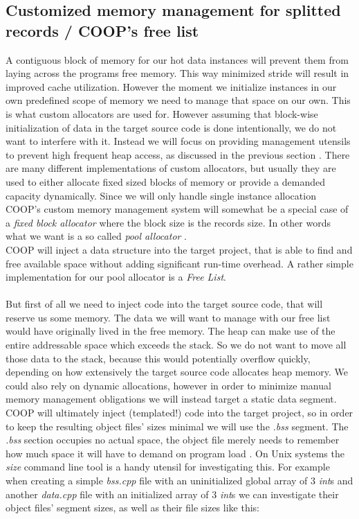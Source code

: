 \subsection{Customized memory management for splitted records / COOP's free list}\label{memory_management}
A contiguous block of memory for our hot data instances will prevent them from laying across the programs free memory. This way minimized stride will result in improved cache utilization. However the moment we initialize instances in our own predefined scope of memory we need to manage that space on our own. This is what custom allocators are used for.
However assuming that block-wise initialization of data in the target source code is done intentionally, we do not want to interfere with it. Instead we will focus on providing management utensils to prevent high frequent heap access, as discussed in the previous section . There are many different implementations of custom allocators, but usually they are used to either allocate fixed sized blocks of memory or provide a demanded capacity dynamically. Since we will only handle single instance allocation COOP's custom memory management system will somewhat be a special case of a \textit{fixed block allocator} where the block size is the records size. In other words what we want is a so called \textit{pool allocator} .\\
COOP will inject a data structure into the target project, that is able to find and free available space without adding significant run-time overhead. A rather simple implementation for our pool allocator is a \textit{Free List}.\\\\
But first of all we need to inject code into the target source code, that will reserve us some memory. The data we will want to manage with our free list would have originally lived in the free memory. The heap can make use of the entire addressable space which exceeds the stack. So we do not want to move all those data to the stack, because this would potentially overflow quickly, depending on how extensively the target source code allocates heap memory. We could also rely on dynamic allocations, however in order to minimize manual memory management obligations we will instead target a static data segment. COOP will ultimately inject (templated!) code into the target project, so in order to keep the resulting object files' sizes minimal we will use the \textit{.bss} segment. The \textit{.bss} section occupies no actual space, the object file merely needs to remember how much space it will have to demand on program load . On Unix systems the \textit{size} command line tool is a handy utensil for investigating this. For example when creating a simple \textit{bss.cpp} file with an uninitialized global array of 3 \textit{int}s and another \textit{data.cpp} file with an initialized array of 3 \textit{int}s we can investigate their object files' segment sizes, as well as their file sizes like this: 
